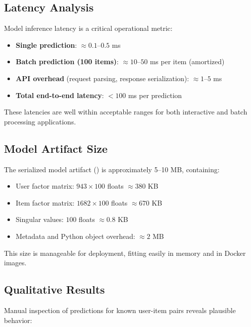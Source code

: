 \subsection{Latency Analysis}

Model inference latency is a critical operational metric:

\begin{itemize}
  \item \textbf{Single prediction}: $\approx 0.1$--$0.5$ ms
  \item \textbf{Batch prediction (100 items)}: $\approx 10$--$50$ ms per item (amortized)
  \item \textbf{API overhead} (request parsing, response serialization): $\approx 1$--$5$ ms
  \item \textbf{Total end-to-end latency}: $< 100$ ms per prediction
\end{itemize}

These latencies are well within acceptable ranges for both interactive and batch processing applications.

\subsection{Model Artifact Size}

The serialized model artifact () is approximately 5--10 MB, containing:

\begin{itemize}
  \item User factor matrix: $943 \times 100$ floats $\approx 380$ KB
  \item Item factor matrix: $1682 \times 100$ floats $\approx 670$ KB
  \item Singular values: $100$ floats $\approx 0.8$ KB
  \item Metadata and Python object overhead: $\approx 2$ MB
\end{itemize}

This size is manageable for deployment, fitting easily in memory and in Docker images.

\subsection{Qualitative Results}

Manual inspection of predictions for known user-item pairs reveals plausible behavior:

